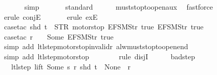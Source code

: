 \begin{isabellebody}
\ \ \ \ \ \isamarkupfalse%
\ simp\isanewline
\ \ \ \ \ \isamarkupfalse%
\ standard\isanewline
\ \ \ \ \isamarkupfalse%
\ must{\isacharunderscore}stop{\isacharunderscore}to{\isacharunderscore}open{\isacharunderscore}aux{}\ \isamarkupfalse%
\ fastforce\isanewline
\ \ \ \ \ \isamarkupfalse%
\ {\isacharparenleft}erule\ conjE{\isacharparenright}\isanewline
\ \ \ \ \ \isamarkupfalse%
\ {\isacharparenleft}erule\ exE{\isacharparenright}{\isacharplus}\isanewline
\ \ \ \ \ \isamarkupfalse%
\ {\isacharparenleft}case{\isacharunderscore}tac\ {\isachardoublequoteopen}shd\ t\ {\isacharequal}\ {\isacharparenleft}STR\ {\isacharprime}{\isacharprime}motorstop{\isacharprime}{\isacharprime}{\isacharcomma}\ {\isacharbrackleft}EFSM{\isachardot}Str\ {\isacharprime}{\isacharprime}true{\isacharprime}{\isacharprime}{\isacharcomma}\ EFSM{\isachardot}Str\ {\isacharprime}{\isacharprime}true{\isacharprime}{\isacharprime}{\isacharbrackright}{\isacharparenright}{\isachardoublequoteclose}{\isacharparenright}\isanewline
\ \ \ \ \ \ \isamarkupfalse%
\ {\isacharparenleft}case{\isacharunderscore}tac\ {\isachardoublequoteopen}r\ {\isachardollar}\ {}\ {\isasymnoteq}\ Some\ {\isacharparenleft}EFSM{\isachardot}Str\ {\isacharprime}{\isacharprime}true{\isacharprime}{\isacharprime}{\isacharparenright}{\isachardoublequoteclose}{\isacharparenright}\isanewline
\ \ \ \ \ \ \ \isamarkupfalse%
\ {\isacharparenleft}simp\ add{\isacharcolon}\ ltl{\isacharunderscore}step{\isacharunderscore}motorstop{\isacharunderscore}invalid{\isacharunderscore}r{}\ alw{\isacharunderscore}must{\isacharunderscore}stop{\isacharunderscore}to{\isacharunderscore}open{\isacharunderscore}end{\isacharparenright}\isanewline
\ \ \ \ \ \ \isamarkupfalse%
\ {\isacharparenleft}simp\ add{\isacharcolon}\ ltl{\isacharunderscore}step{\isacharunderscore}motorstop{\isacharparenright}\isanewline
\ \ \ \ \ \ \isamarkupfalse%
\ {\isacharparenleft}rule\ disjI{}{\isacharparenright}\isanewline
\ \ \ \ \isamarkupfalse%
%
\endisatagproof
{\isafoldproof}%
%
\isadelimproof
\isanewline
%
\endisadelimproof
\isanewline
{}\isamarkupfalse%
\ bad{\isacharunderscore}step{\isacharcolon}\isanewline
\ \ \ {\isachardoublequoteopen}ltl{\isacharunderscore}step\ lift\ {\isacharparenleft}Some\ s{\isacharparenright}\ r\ {\isacharparenleft}shd\ t{\isacharparenright}\ {\isacharequal}\ {\isacharparenleft}None{\isacharcomma}\ {\isacharbrackleft}{\isacharbrackright}{\isacharcomma}\ r{\isacharparenright}{\isachardoublequoteclose}\isanewline

\end{isabellebody}
